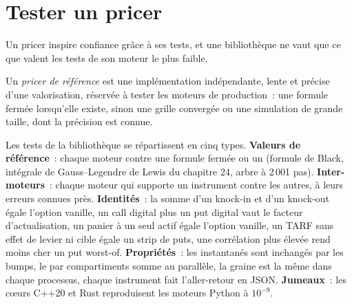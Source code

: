 \begin{omfigure}

\label{fig:dv:build-a-pricing-library:scen}
\end{omfigure}

\section{Tester un pricer}

Un pricer inspire confiance grâce à ses tests, et une bibliothèque ne vaut que ce que valent les tests de son moteur le plus faible.

\begin{definition}\label{def:dv:build-a-pricing-library:reference}
Un \emph{pricer de référence} est une implémentation indépendante, lente et précise d'une valorisation, réservée à tester les moteurs de production~:
une formule fermée lorsqu'elle existe, sinon une grille convergée ou une simulation de grande taille, dont la précision est connue.
\end{definition}

Les tests de la bibliothèque se répartissent en cinq types. \textbf{Valeurs de référence}~: chaque moteur contre une formule fermée ou un  (formule de Black, intégrale de Gauss--Legendre
de Lewis du chapitre 24, arbre à 2\,001 pas). \textbf{Inter-moteurs}~: chaque moteur qui supporte un instrument contre les autres, à leurs erreurs connues
près. \textbf{Identités}~: la somme d'un knock-in et d'un knock-out égale l'option vanille, un call digital plus un put digital vaut le facteur d'actualisation, un panier à un seul actif égale
l'option vanille, un TARF sans effet de levier ni cible égale un strip de puts, une corrélation plus élevée rend moins cher un put worst-of. \textbf{Propriétés}~: les instantanés sont inchangés par
les bumps, le  par compartiments somme au  parallèle, la graine est la même dans chaque processus, chaque instrument fait l'aller-retour en JSON. \textbf{Jumeaux}~: les cœurs C++20 et Rust
reproduisent les moteurs Python à $10^{-9}$.


